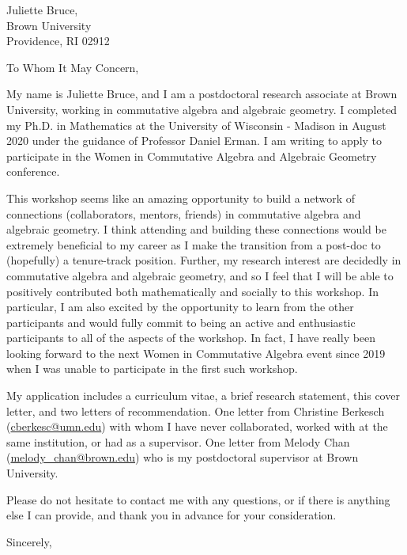 \documentclass[11pt]{brownletter}
\date{October 11, 2022} %
\begin{document}
\begin{letter}{Juliette Bruce,\\ 
               Brown University\\ 
               Providence, RI 02912}

\opening{To Whom It May Concern,}

My name is Juliette Bruce, and I am a postdoctoral research associate at Brown University, working in commutative algebra and algebraic geometry. I completed my Ph.D. in Mathematics at the University of Wisconsin - Madison in August 2020 under the guidance of Professor Daniel Erman. I am writing to apply to participate in the Women in Commutative Algebra and Algebraic Geometry conference.

This workshop seems like an amazing opportunity to build a network of connections (collaborators, mentors, friends) in commutative algebra and algebraic geometry. I think attending and building these connections would be extremely beneficial to my career as I make the transition from a post-doc to (hopefully) a tenure-track position. Further, my research interest are decidedly in commutative algebra and algebraic geometry, and so I feel that I will be able to positively contributed both mathematically and socially to this workshop. In particular, I am also excited by the opportunity to learn from the other participants and would fully commit to being an active and enthusiastic participants to all of the aspects of the workshop. In fact, I have really been looking forward to the next Women in Commutative Algebra event since 2019 when I was unable to participate in the first such workshop. 


My application includes a curriculum vitae, a brief research statement, this cover letter, and two letters of recommendation. One letter from Christine Berkesch (\href{mailto:cberkesc@umn.edu}{cberkesc@umn.edu}) with whom I have never collaborated, worked with at the same institution, or had as a supervisor. One letter from Melody Chan (\href{mailto:melody\_chan@brown.edu}{melody\_chan@brown.edu}) who is my postdoctoral supervisor at Brown University. 


Please do not hesitate to contact me with any questions, or if there is anything else I can provide, and thank you in advance for your consideration. 


\closing{Sincerely,}




\end{letter}
\end{document}
